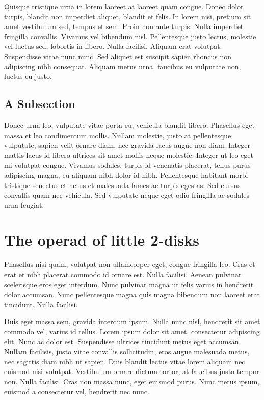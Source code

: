 Quisque tristique urna in lorem laoreet at laoreet quam congue. Donec dolor turpis, blandit non imperdiet aliquet, blandit et felis. In lorem nisi, pretium sit amet vestibulum sed, tempus et sem. Proin non ante turpis. Nulla imperdiet fringilla convallis. Vivamus vel bibendum nisl. Pellentesque justo lectus, molestie vel luctus sed, lobortis in libero. Nulla facilisi. Aliquam erat volutpat. Suspendisse vitae nunc nunc. Sed aliquet est suscipit sapien rhoncus non adipiscing nibh consequat. Aliquam metus urna, faucibus eu vulputate non, luctus eu justo.

\subsection{A Subsection}

Donec urna leo, vulputate vitae porta eu, vehicula blandit libero. Phasellus eget massa et leo condimentum mollis. Nullam molestie, justo at pellentesque vulputate, sapien velit ornare diam, nec gravida lacus augue non diam. Integer mattis lacus id libero ultrices sit amet mollis neque molestie. Integer ut leo eget mi volutpat congue. Vivamus sodales, turpis id venenatis placerat, tellus purus adipiscing magna, eu aliquam nibh dolor id nibh. Pellentesque habitant morbi tristique senectus et netus et malesuada fames ac turpis egestas. Sed cursus convallis quam nec vehicula. Sed vulputate neque eget odio fringilla ac sodales urna feugiat.

\section{The operad of little 2-disks}

Phasellus nisi quam, volutpat non ullamcorper eget, congue fringilla leo. Cras et erat et nibh placerat commodo id ornare est. Nulla facilisi. Aenean pulvinar scelerisque eros eget interdum. Nunc pulvinar magna ut felis varius in hendrerit dolor accumsan. Nunc pellentesque magna quis magna bibendum non laoreet erat tincidunt. Nulla facilisi.

Duis eget massa sem, gravida interdum ipsum. Nulla nunc nisl, hendrerit sit amet commodo vel, varius id tellus. Lorem ipsum dolor sit amet, consectetur adipiscing elit. Nunc ac dolor est. Suspendisse ultrices tincidunt metus eget accumsan. Nullam facilisis, justo vitae convallis sollicitudin, eros augue malesuada metus, nec sagittis diam nibh ut sapien. Duis blandit lectus vitae lorem aliquam nec euismod nisi volutpat. Vestibulum ornare dictum tortor, at faucibus justo tempor non. Nulla facilisi. Cras non massa nunc, eget euismod purus. Nunc metus ipsum, euismod a consectetur vel, hendrerit nec nunc.

